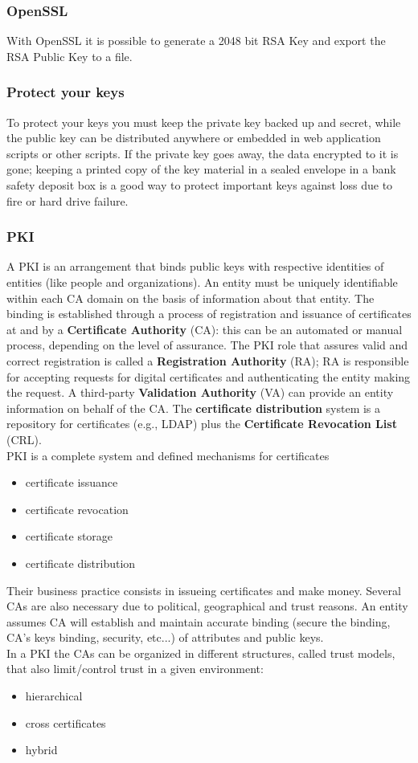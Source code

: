 \documentclass[a4paper, 10pt, titlepage]{article}
\begin{document}
\subsubsection*{OpenSSL}
With OpenSSL it is possible to generate a 2048 bit RSA Key and export the RSA Public Key to a file.

\subsubsection*{Protect your keys}
To protect your keys you must keep the private key backed up and secret, while the public key can be distributed anywhere or embedded in web application scripts or other scripts. If the private key goes away, the data encrypted to it is gone; keeping a printed copy of the key material in a sealed envelope in a bank safety deposit box is a good way to protect important keys against loss due to fire or hard drive failure.

\subsubsection{PKI}
A PKI is an arrangement that binds public keys with respective identities of entities (like people and organizations). An entity must be uniquely identifiable within each CA domain on the basis of information about that entity. The binding is established through a process of registration and issuance of certificates at and by a \textbf{Certificate Authority} (CA): this can be an automated or manual process, depending on the level of assurance.
The PKI role that assures valid and correct registration is called a \textbf{Registration Authority} (RA); RA is responsible for accepting requests for digital certificates and authenticating the entity making the request. A third-party \textbf{Validation Authority} (VA) can provide an entity information on behalf of the CA. The \textbf{certificate distribution} system is a repository for certificates (e.g., LDAP) plus the  \textbf{Certificate Revocation List} (CRL). \\
PKI is a complete system and defined mechanisms for certificates
\begin{itemize}
\item certificate issuance
\item certificate revocation
\item certificate storage
\item certificate distribution
\end{itemize}
Their business practice consists in issueing certificates and make money. Several CAs are also necessary due to political, geographical and trust reasons. An entity assumes CA will establish and maintain accurate binding (secure the binding, CA’s keys binding, security, etc...) of attributes and public keys. \\
In a PKI the CAs can be organized in different structures, called
trust models, that also limit/control trust in a given environment:
\begin{itemize}
\item hierarchical
\item cross certificates
\item hybrid
\end{itemize}
\end{document}
